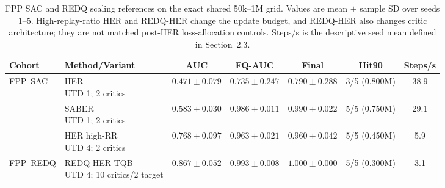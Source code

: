 \begin{table}[t]
\centering
\small
\setlength{\tabcolsep}{3.5pt}
\begin{tabular}{llccccc}
\toprule
Cohort & Method/Variant & AUC & FQ-AUC & Final & Hit90 & Steps/s \\
\midrule
FPP--SAC & \shortstack[l]{HER\\UTD 1; 2 critics} & \(0.471\pm0.079\) &
\(0.735\pm0.247\) & \(0.790\pm0.288\) & 3/5 (0.800M) & 38.9 \\
 & \shortstack[l]{SABER\\UTD 1; 2 critics} & \(0.583\pm0.030\) &
\(0.986\pm0.011\) & \(0.990\pm0.022\) & 5/5 (0.750M) & 29.1 \\
 & \shortstack[l]{HER high-RR\\UTD 4; 2 critics} & \(0.768\pm0.097\) &
\(0.963\pm0.021\) & \(0.960\pm0.042\) & 5/5 (0.450M) & 5.9 \\
FPP--REDQ & \shortstack[l]{REDQ-HER TQB\\UTD 4; 10 critics/2 target} &
\(0.867\pm0.052\) & \(0.993\pm0.008\) & \(1.000\pm0.000\) &
5/5 (0.300M) & 3.1 \\
\bottomrule
\end{tabular}
\caption{FPP SAC and REDQ scaling references on the exact shared 50k--1M
grid. Values are mean $\pm$ sample SD over seeds 1--5.
High-replay-ratio HER and REDQ-HER change the update budget, and REDQ-HER
also changes critic architecture; they are not matched post-HER
loss-allocation controls. Steps/s is the descriptive seed mean defined in
Section~2.3.}
\label{tab:supp-sac-scaling}
\end{table}
